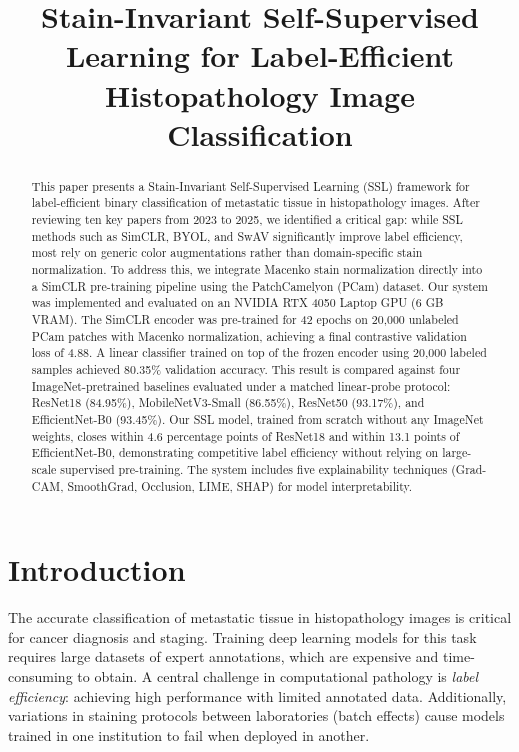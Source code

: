 \documentclass[conference]{IEEEtran}
\begin{document}
\title{Stain-Invariant Self-Supervised Learning for Label-Efficient Histopathology Image Classification}

\author{
}

\maketitle

\begin{abstract}
This paper presents a Stain-Invariant Self-Supervised Learning (SSL) framework for label-efficient binary classification of metastatic tissue in histopathology images. After reviewing ten key papers from 2023 to 2025, we identified a critical gap: while SSL methods such as SimCLR, BYOL, and SwAV significantly improve label efficiency, most rely on generic color augmentations rather than domain-specific stain normalization. To address this, we integrate Macenko stain normalization directly into a SimCLR pre-training pipeline using the PatchCamelyon (PCam) dataset. Our system was implemented and evaluated on an NVIDIA RTX 4050 Laptop GPU (6 GB VRAM). The SimCLR encoder was pre-trained for 42 epochs on 20,000 unlabeled PCam patches with Macenko normalization, achieving a final contrastive validation loss of 4.88. A linear classifier trained on top of the frozen encoder using 20,000 labeled samples achieved 80.35\% validation accuracy. This result is compared against four ImageNet-pretrained baselines evaluated under a matched linear-probe protocol: ResNet18 (84.95\%), MobileNetV3-Small (86.55\%), ResNet50 (93.17\%), and EfficientNet-B0 (93.45\%). Our SSL model, trained from scratch without any ImageNet weights, closes within 4.6 percentage points of ResNet18 and within 13.1 points of EfficientNet-B0, demonstrating competitive label efficiency without relying on large-scale supervised pre-training. The system includes five explainability techniques (Grad-CAM, SmoothGrad, Occlusion, LIME, SHAP) for model interpretability.
\end{abstract}

\section{Introduction}
The accurate classification of metastatic tissue in histopathology images is critical for cancer diagnosis and staging. Training deep learning models for this task requires large datasets of expert annotations, which are expensive and time-consuming to obtain. A central challenge in computational pathology is \textit{label efficiency}: achieving high performance with limited annotated data. Additionally, variations in staining protocols between laboratories (batch effects) cause models trained in one institution to fail when deployed in another.
\end{document}
